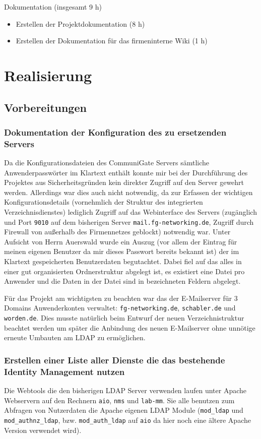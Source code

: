 \documentclass[11pt,a4paper,titlepage=firstiscover]{scrartcl} %
\begin{document}
Dokumentation (insgesamt 9 h)
	\begin{itemize}
	\item Erstellen der Projektdokumentation (8 h)
	\item Erstellen der Dokumentation für das firmeninterne Wiki (1 h)
	\end{itemize}

\section{Realisierung}
\subsection{Vorbereitungen}
\subsubsection{Dokumentation der Konfiguration des zu ersetzenden Servers}\label{sec:Konfig-Doku-Alt}
Da die Konfigurationsdateien des CommuniGate Servers s\"amtliche Anwenderpassw\"orter im Klartext enth\"alt konnte mir bei der Durchf\"uhrung des Projektes aus Sicherheitsgr\"unden kein direkter Zugriff auf den Server gewehrt werden. Allerdings war dies auch nicht notwendig, da zur Erfassen der wichtigen Konfigurationsdetails (vornehmlich der Struktur des integrierten Verzeichnisdienstes) lediglich Zugriff auf das Webinterface des Servers (zug\"anglich und Port \texttt{9010} auf dem bisherigen Server \texttt{mail.fg-networking.de}, Zugriff durch Firewall von au\ss{}erhalb des Firmennetzes geblockt) notwendig war. Unter Aufsicht von Herrn Auerswald wurde ein Auszug (vor allem der Eintrag f\"ur meinen eigenen Benutzer da mir dieses Passwort bereits bekannt ist) der im Klartext gespeicherten Benutzerdaten begutachtet. Dabei fiel auf das alles in einer gut organisierten Ordnerstruktur abgelegt ist, es existiert eine Datei pro Anwender und die Daten in der Datei sind in bezeichneten Feldern abgelegt.

F\"ur das Projekt am wichtigsten zu beachten war das der E-Mailserver f\"ur 3 Domains Anwenderkonten verwaltet: \texttt{fg-networking.de}, \texttt{schabler.de} und \texttt{worden.de}. Dies musste nat\"urlich beim Entwurf der neuen Verzeichnistruktur beachtet werden um sp\"ater die Anbindung des neuen E-Mailserver ohne unn\"otige erneute Umbauten am LDAP zu erm\"oglichen.

\subsubsection{Erstellen einer Liste aller Dienste die das bestehende Identity Management nutzen}
Die Webtools die den bisherigen LDAP Server verwenden laufen unter Apache Webservern auf den Rechnern \texttt{aio}, \texttt{nms} und \texttt{lab-mm}. Sie alle benutzen zum Abfragen von Nutzerdaten die Apache eigenen LDAP Module (\texttt{mod\_ldap} und \texttt{mod\_authnz\_ldap}, bzw. \texttt{mod\_auth\_ldap} auf \texttt{aio} da hier noch eine \"altere Apache Version verwendet wird). 
\end{document}
